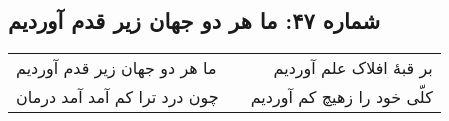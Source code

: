 \begin{center}
\section*{شماره ۴۷: ما هر دو جهان زیر قدم آوردیم}
\label{sec:047}
\begin{longtable}{l p{0.5cm} r}
ما هر دو جهان زیر قدم آوردیم
&&
بر قبهٔ افلاک علم آوردیم
\\
چون درد ترا کم آمد آمد درمان
&&
کلّی خود را زهیچ کم آوردیم
\\
\end{longtable}
\end{center}
